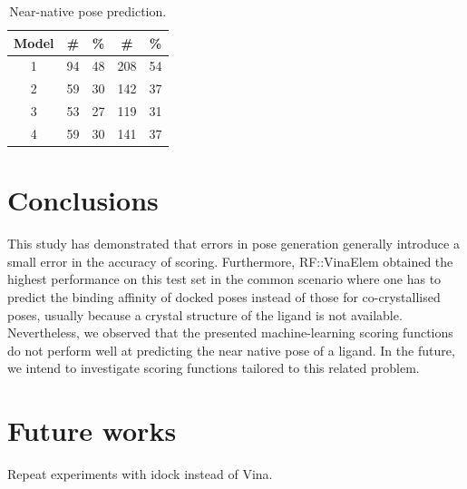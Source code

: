 \begin{table}
\caption{Near-native pose prediction.}
\label{rfscore4:nearnative}
\begin{tabular}{ccccc}
\hline
Model & \# & \% & \# & \%\\
\hline
1 & 94 & 48 & 208 & 54\\
2 & 59 & 30 & 142 & 37\\
3 & 53 & 27 & 119 & 31\\
4 & 59 & 30 & 141 & 37\\
\hline
\end{tabular}
\end{table}

\section{Conclusions}

This study has demonstrated that errors in pose generation generally introduce a small error in the accuracy of scoring. Furthermore, RF::VinaElem obtained the highest performance on this test set in the common scenario where one has to predict the binding affinity of docked poses instead of those for co-crystallised poses, usually because a crystal structure of the ligand is not available. Nevertheless, we observed that the presented machine-learning scoring functions do not perform well at predicting the near native pose of a ligand. In the future, we intend to investigate scoring functions tailored to this related problem.

\section{Future works}

Repeat experiments with idock instead of Vina.

\chapterend
